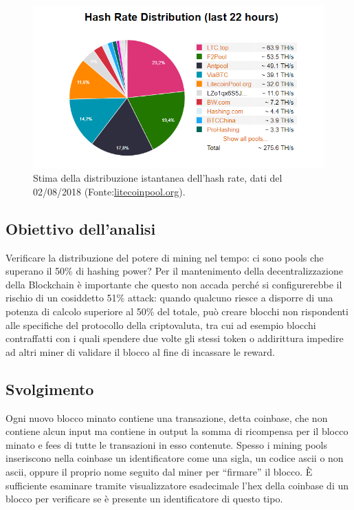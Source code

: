\begin{figure}[h!]
	\centering
	\includegraphics[width=1.0\linewidth]{images/HashingPower020818}
	\caption{Stima della distribuzione istantanea dell'hash rate, dati del 02/08/2018 (Fonte:\url{litecoinpool.org}).}
	\label{fig:hashingpower020818}
\end{figure}


\subsection{Obiettivo dell’analisi}
Verificare la distribuzione del potere di mining nel tempo: ci sono pools che superano il 50\% di hashing power? Per il mantenimento della decentralizzazione della Blockchain è importante che questo non accada perché si configurerebbe il rischio di un cosiddetto 51\% attack: quando qualcuno riesce a disporre di una potenza di calcolo superiore al 50\% del totale, può creare blocchi non rispondenti alle specifiche del protocollo della criptovaluta, tra cui ad esempio blocchi contraffatti con i quali spendere due volte gli stessi token o addirittura impedire ad altri miner di validare il blocco al fine di incassare le reward.


\subsection{Svolgimento}
Ogni nuovo blocco minato contiene una transazione, detta coinbase, che non contiene alcun input ma contiene in output la somma di ricompensa per il blocco minato e fees di tutte le transazioni in esso contenute.
Spesso i mining pools inseriscono nella coinbase un identificatore come una sigla, un codice ascii o non ascii, oppure il proprio nome seguito dal miner per “firmare” il blocco. È sufficiente esaminare tramite visualizzatore esadecimale l’hex della coinbase di un blocco per verificare se è presente un identificatore di questo tipo.

